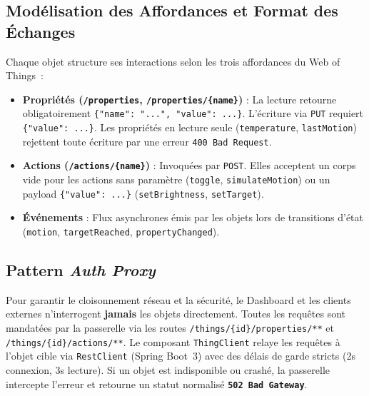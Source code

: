 \documentclass[10pt,a4paper]{article}
\begin{document}
\subsection{Modélisation des Affordances et Format des Échanges}
Chaque objet structure ses interactions selon les trois affordances du Web of Things~:
\begin{itemize}
  \item \textbf{Propriétés (\texttt{/properties}, \texttt{/properties/\{name\}})} : La lecture retourne obligatoirement \texttt{\{"name": "...", "value": ...\}}. L'écriture via \texttt{PUT} requiert \texttt{\{"value": ...\}}. Les propriétés en lecture seule (\texttt{temperature}, \texttt{lastMotion}) rejettent toute écriture par une erreur \texttt{400 Bad Request}.
  \item \textbf{Actions (\texttt{/actions/\{name\}})} : Invoquées par \texttt{POST}. Elles acceptent un corps vide pour les actions sans paramètre (\texttt{toggle}, \texttt{simulateMotion}) ou un payload \texttt{\{"value": ...\}} (\texttt{setBrightness}, \texttt{setTarget}).
  \item \textbf{Événements} : Flux asynchrones émis par les objets lors de transitions d'état (\texttt{motion}, \texttt{targetReached}, \texttt{propertyChanged}).
\end{itemize}

\subsection{Pattern \emph{Auth Proxy}}
Pour garantir le cloisonnement réseau et la sécurité, le Dashboard et les clients externes n'interrogent \textbf{jamais} les objets directement. Toutes les requêtes sont mandatées par la passerelle via les routes \texttt{/things/\{id\}/properties/**} et \texttt{/things/\{id\}/actions/**}. Le composant \texttt{ThingClient} relaye les requêtes à l'objet cible via \texttt{RestClient} (Spring Boot~3) avec des délais de garde stricts (2s connexion, 3s lecture). Si un objet est indisponible ou crashé, la passerelle intercepte l'erreur et retourne un statut normalisé \textbf{\texttt{502 Bad Gateway}}.
\end{document}
